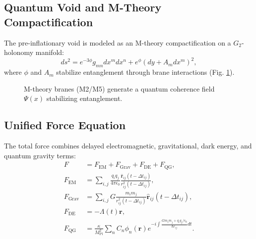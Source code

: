 \documentclass[12pt, a4paper]{article}
\begin{document}
\subsection{Quantum Void and M-Theory Compactification}
The pre-inflationary void is modeled as an M-theory compactification on a \(G_2\)-holonomy manifold:
\begin{equation}
ds^2 = e^{-3\phi} g_{mn} dx^m dx^n + e^{\phi} (dy + A_m dx^m)^2, \label{eq:G2}
\end{equation}
where \(\phi\) and \(A_m\) stabilize entanglement through brane interactions (Fig. \ref{fig:mtheory}).

\begin{figure}[h]
\centering
{}
\caption{M-theory branes (M2/M5) generate a quantum coherence field \(\Psi(x)\) stabilizing entanglement.}
\label{fig:mtheory}
\end{figure}

\subsection{Unified Force Equation}
The total force combines delayed electromagnetic, gravitational, dark energy, and quantum gravity terms:
\begin{align}
F &= F_{\text{EM}} + F_{\text{Grav}} + F_{\text{DE}} + F_{\text{QG}}, \label{eq:force} \\
F_{\text{EM}} &= \sum_{i,j} \frac{q_i q_j}{4\pi \epsilon_0} \frac{\hat{\bm{r}}_{ij}(t - \Delta t_{ij})}{r_{ij}^2(t - \Delta t_{ij})}, \nonumber \\
F_{\text{Grav}} &= \sum_{i,j} G \frac{m_i m_j}{r_{ij}^2(t - \Delta t_{ij})} \hat{\bm{r}}_{ij}(t - \Delta t_{ij}), \nonumber \\
F_{\text{DE}} &= -\Lambda(t) \bm{r}, \nonumber \\
F_{\text{QG}} &= \frac{\kappa}{M_{\text{Pl}}^2} \sum_{n} C_n \phi_n(\bm{r}) e^{-i \int \frac{G m_i m_j + q_i q_j / \epsilon_0}{\hbar r_{ij}} dt}. \nonumber
\end{align}
\end{document}
